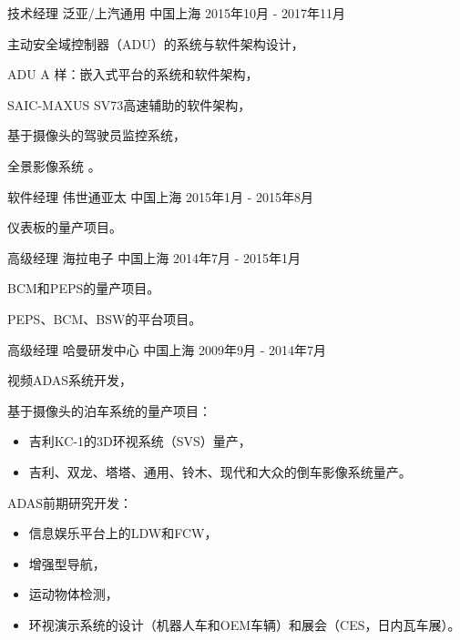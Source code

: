 \documentclass[../resume_xin.tex]{subfiles}
\begin{document}
\begin{cventries}
  \cventry
    {技术经理} %
    {泛亚/上汽通用} %
    {中国上海} %
    {2015年10月 - 2017年11月} %
    {
      \begin{cvitems}
        \item 主动安全域控制器（ADU）的系统与软件架构设计，
        \item ADU A 样：嵌入式平台的系统和软件架构，
        \item SAIC-MAXUS SV73高速辅助的软件架构，
        \item 基于摄像头的驾驶员监控系统，
        \item 全景影像系统 \supercite{Xin_RearView_17}。
      \end{cvitems}
    }


  \cventry
    {软件经理} %
    {伟世通亚太} %
    {中国上海} %
    {2015年1月 - 2015年8月} %
    {
      \begin{cvitems}
        \item 仪表板的量产项目。
      \end{cvitems}
    }

  \cventry
    {高级经理} %
    {海拉电子} %
    {中国上海} %
    {2014年7月 - 2015年1月} %
    {
      \begin{cvitems}
        \item BCM和PEPS的量产项目。
        \item PEPS、BCM、BSW的平台项目。
      \end{cvitems}
    }

  \cventry
    {高级经理} %
    {哈曼研发中心} %
    {中国上海} %
    {2009年9月 - 2014年7月} %
    {
      \begin{cvitems}
        \item 视频ADAS系统开发，
        \item 基于摄像头的泊车系统的量产项目：
          \begin{itemize}
            \item 吉利KC-1的3D环视系统（SVS）量产，
            \item 吉利、双龙、塔塔、通用、铃木、现代和大众的倒车影像系统量产。
           \end{itemize}
        \item ADAS前期研究开发：
          \begin{itemize}
            \item 信息娱乐平台上的LDW和FCW，
            \item 增强型导航，
            \item 运动物体检测，
            \item 环视演示系统的设计（机器人车和OEM车辆）和展会（CES，日内瓦车展）。
          \end{itemize}
      \end{cvitems}
    }
\end{cventries}
\end{document}
